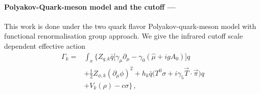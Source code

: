\documentclass[%
reprint,
superscriptaddress,
showpacs,preprintnumbers,
 amsmath,amssymb,
 aps,
prl,
]{revtex4-1}
\begin{document}
\paragraph*{Polyakov-Quark-meson model and the cutoff ---\!\!\!}
\label{sec:pqm}
This work is done under the two quark flavor Polyakov-quark-meson model with functional renormalisation group approach. We give the infrared cutoff scale dependent effective action
\begin{align}
  \Gamma_k=&\int_x \bigg\{Z_{q,k}\bar{q} \Big [\gamma_\mu \partial_\mu -\gamma_0(\hat\mu+igA_0) \Big ]q \nonumber\\[2ex]
  &+\frac{1}{2}Z_{\phi,k}(\partial_\mu \phi)^2\nonumber+h_k\bar{q}\big(T^0\sigma+i\gamma_5\vec{T}\cdot \vec{\pi}\big)q\\[2ex]
  &+V_k(\rho)-c\sigma \bigg\}\,,
\label{eaction}
\end{align}
\end{document}
